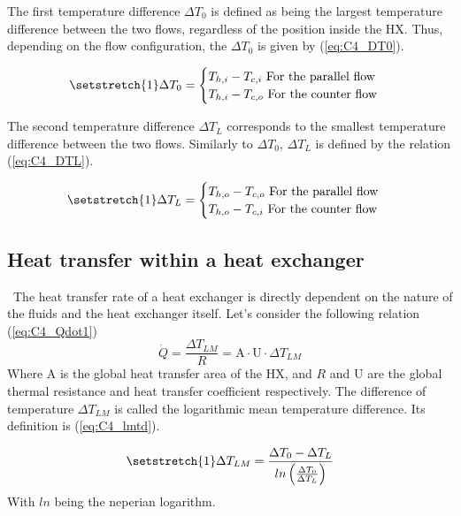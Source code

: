 The first temperature difference \(\Delta T_0\) is defined as being the largest temperature difference between the two flows, regardless of the position inside the HX. Thus, depending on the flow configuration, the \(\Delta T_0\) is given by (\ref{eq:C4_DT0}).

\begin{equation}
    \setstretch{1}
    \Delta T_0 =
    \begin{cases}
        T_{h,i} - T_{c,i} \text{ For the parallel flow} \\
        T_{h,i} - T_{c,o} \text{ For the counter flow}  \\
    \end{cases}\label{eq:C4_DT0}
\end{equation}

The second temperature difference \(\Delta T_L\) corresponds to the smallest temperature difference between the two flows. Similarly to \(\Delta T_0\), \(\Delta T_L\) is defined by the relation (\ref{eq:C4_DTL}).

\begin{equation}
    \setstretch{1}
    \Delta T_L =
    \begin{cases}
        T_{h,o} - T_{c,o} \text{ For the parallel flow} \\
        T_{h,o} - T_{c,i} \text{ For the counter flow}  \\
    \end{cases}\label{eq:C4_DTL}
\end{equation}

\subsection{Heat transfer within a heat exchanger}
\quad\ The heat transfer rate of a heat exchanger is directly dependent on the nature of the fluids and the heat exchanger itself. Let's consider the following relation (\ref{eq:C4_Qdot1})
\begin{equation}
    \dot{Q} = \frac{\Delta T_{LM}}{R}= \mathrm{A}\cdot \mathrm{U}\cdot \Delta T_{LM}\label{eq:C4_Qdot1}
\end{equation}
Where \(\mathrm{A}\) is the global heat transfer area of the HX, and \(R\) and \(\mathrm{U}\) are the global thermal resistance and heat transfer coefficient respectively. The difference of temperature \(\Delta T_{LM}\) is called the logarithmic mean temperature difference. Its definition is (\ref{eq:C4_lmtd}).


\begin{equation}
    \setstretch{1}
    \Delta T_{LM} = \frac{\Delta T_0-\Delta T_L}{ln\left(\frac{\Delta T_0}{\Delta T_L}\right)}\label{eq:C4_lmtd}
\end{equation}
With \(ln\) being the neperian logarithm.

